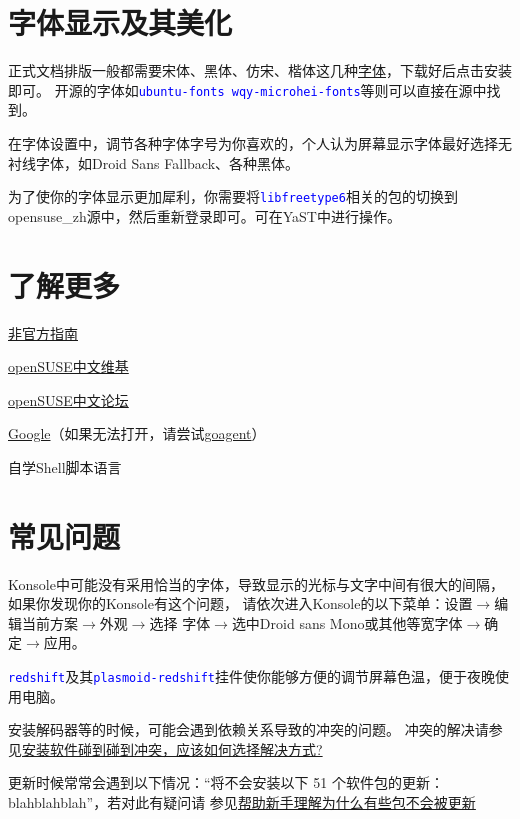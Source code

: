 \documentclass[10pt,openany]{book}
\newcommand{\soft}[1]{\texttt{\textcolor{blue}{#1}}}
\begin{document}
\section{字体显示及其美化}
正式文档排版一般都需要宋体、黑体、仿宋、楷体这几种\href{http://pan.baidu.com/s/1mgiHWmO}{字体}，下载好后点击安装即可。
开源的字体如\soft{ubuntu-fonts wqy-microhei-fonts}等则可以直接在源中找到。

在字体设置中，调节各种字体字号为你喜欢的，个人认为屏幕显示字体最好选择无衬线字体，如Droid Sans Fallback、各种黑体。

为了使你的字体显示更加犀利，你需要将\soft{libfreetype6}相关的包的切换到opensuse\_zh源中，然后重新登录即可。可在YaST中进行操作。

\section{了解更多}
\begin{compactitem}
 \item \href{https://lug.ustc.edu.cn/sites/opensuse-guide/}{非官方指南}
 \item \href{https://zh.opensuse.org/%E9%A6%96%E9%A1%B5}{openSUSE中文维基}
 \item \href{https://forum.suse.org.cn/}{openSUSE中文论坛}
 \item \href{https://google.com}{Google}（如果无法打开，请尝试\href{https://code.google.com/p/goagent/}{goagent}）
 \item 自学Shell脚本语言
\end{compactitem}
\section{常见问题}
Konsole中可能没有采用恰当的字体，导致显示的光标与文字中间有很大的间隔，如果你发现你的Konsole有这个问题，
请依次进入Konsole的以下菜单：设置$\rightarrow$编辑当前方案$\rightarrow$外观$\rightarrow$选择
字体$\rightarrow$选中Droid sans Mono或其他等宽字体$\rightarrow$确定$\rightarrow$应用。

\soft{redshift}及其\soft{plasmoid-redshift}挂件使你能够方便的调节屏幕色温，便于夜晚使用电脑。

安装解码器等的时候，可能会遇到依赖关系导致的冲突的问题。
冲突的解决请参见\href{https://forum.suse.org.cn/viewtopic.php?t=2867&p=22491#p22491}{安装软件碰到碰到冲突，应该如何选择解决方式?}

更新时候常常会遇到以下情况：“将不会安装以下 51 个软件包的更新：blahblahblah”，若对此有疑问请
参见\href{https://forum.suse.org.cn/viewtopic.php?t=2777&p=21896}{帮助新手理解为什么有些包不会被更新}
\end{document}
